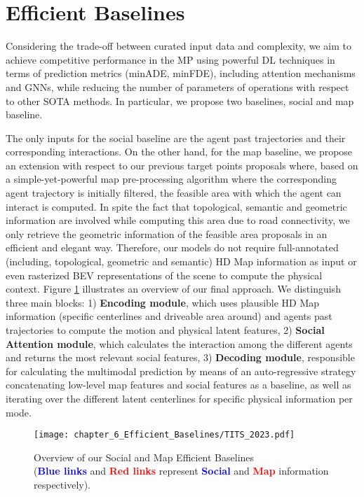 \section{Efficient Baselines}
\label{sec:6_efficient_baselines}

Considering the trade-off between curated input data and complexity, we aim to achieve competitive performance in the \ac{MP} using powerful DL techniques in terms of prediction metrics (\ac{minADE}, \ac{minFDE}), including attention mechanisms and \acp{GNN}, while reducing the number of parameters of operations with respect to other \ac{SOTA} methods. In particular, we propose two baselines, social and map baseline. 

The only inputs for the social baseline are the agent past trajectories and their corresponding interactions. On the other hand, for the map baseline, we propose an extension with respect to our previous target points proposals where, based on a simple-yet-powerful map pre-processing algorithm where the corresponding agent trajectory is initially filtered, the feasible area with which the agent can interact is computed. In spite the fact that topological, semantic and geometric information are involved while computing this area due to road connectivity, we only retrieve the geometric information of the feasible area proposals in an efficient and elegant way. Therefore, our models do not require full-annotated (including, topological, geometric and semantic) HD Map information as input or even rasterized \ac{BEV} representations of the scene to compute the physical context. Figure \ref{fig:chapter_6_Efficient_Baselines/TITS_2023} illustrates an overview of our final approach. We distinguish three main blocks: 1) \textbf{Encoding module}, which uses plausible HD Map information (specific centerlines and driveable area around) and agents past trajectories to compute the motion and physical latent features, 2) \textbf{Social Attention module}, which calculates the interaction among the different agents and returns the most relevant social features, 3) \textbf{Decoding module}, responsible for calculating the multimodal prediction by means of an auto-regressive strategy concatenating low-level map features and social features as a baseline, as well as iterating over the different latent centerlines for specific physical information per mode.



\begin{figure}[!h]
	\centering
	\setlength{\tabcolsep}{2.0pt}
	\texttt{[image: chapter\_6\_Efficient\_Baselines/TITS\_2023.pdf]}
	\caption[Overview of our Social and Map Efficient Baselines]{Overview of our Social and Map Efficient Baselines \\ (\textbf{\textcolor{blue}{Blue links}} and \textbf{\textcolor{red}{Red links}} represent \textbf{\textcolor{blue}{Social}} and \textbf{\textcolor{red}{Map}} information respectively).}
	\label{fig:chapter_6_Efficient_Baselines/TITS_2023}
\end{figure}

